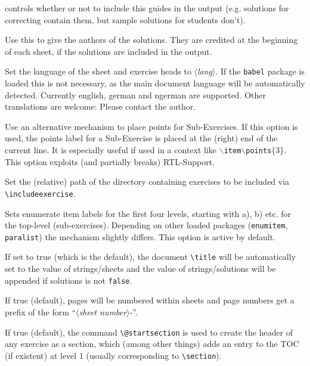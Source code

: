 \documentclass[DIV12,BCOR0mm]{scrartcl}
\newcommand{\param}[1]{$\langle${\normalfont\itshape #1\/}$\rangle$}
\newcommand{\maybe}[1]{\textcolor{green!50!black}{#1}}
\newcommand{\mand}[1]{\textcolor{blue!50!black}{#1}}
\newcommand{\codestyle}{\normalfont\ttfamily\color{blue!50!black}}
\newcommand{\optionstyle}{\normalfont\ttfamily\color{red!50!black}}
\newcommand{\option}[1]{{\optionstyle #1}}
\newcommand{\optitem}[1][]{\item[{\codestyle #1}]}
\begin{document}
\begin{description}
  controls whether or not to include this guides in the output (e.g. solutions for
  correcting contain them, but sample solutions for students don't).
 \optitem[{\option{solutionsby}=\mand{\param{name/names}}}] Use this to give the authors of the
  solutions. They are credited at the beginning of each sheet, if the solutions
  are included in the output.
 \optitem[{\option{language}=\mand{\param{lang}}}] Set the language of the sheet and
  exercise heads to \param{lang}. If the \texttt{babel} package is loaded this
  is not necessary, as the main document language will be automatically
  detected. Currently \option{english}, \option{german} and \option{ngerman} are
  supported. Other translations are welcome: Please contact the author.
 \optitem[{\option{pointsfloatright}}] Use an alternative mechanism to place points for Sub-Exercises.
  If this option is used, the points label for a Sub-Exercise is placed at the (right) end of the current line.
  It is especially useful if used in a context like \texttt{$\backslash$item$\backslash$points$\{3\}$}.
  This option exploits (and partially breaks) RTL-Support.
 \optitem[{\option{exercisespath}}] Set the (relative) path of the
  directory containing exercises to be included via
  \lstinline|\includeexercise|.
 \optitem[{\option{patchenumerate}\maybe{=\param{true/false}}}] Sets
  enumerate item labels for the first four levels, starting with
  a), b) etc. for the top-level (sub-exercises). Depending on other
  loaded packages (\lstinline|enumitem|, \lstinline|paralist|) the mechanism
  slightly differs. This option is active by default.
 \optitem[{\option{settitle}\maybe{=\param{true/false}}}] If set to true
  (which is the default),
  the document \lstinline|\title| will be automatically set to the value
  of \option{strings/sheets} and the value of \option{strings/solutions} will be
  appended if \option{solutions} is not \lstinline|false|.
 \optitem[{\option{patchpagenumbers}\maybe{=\param{true/false}}}] If true
  (default), pages will be numbered within sheets and page numbers
  get a prefix of the form ``{\codestyle\param{sheet number}-}''.
 \optitem[{\option{usestartsection}\maybe{=\param{true/false}}}] If true
  (default), the command \lstinline|\@startsection| is used to create
  the header of any exercise as a section, which (among other
  things) adds an entry to the TOC (if existent) at level 1
  (usually corresponding to \lstinline|\section|).

\end{description}
\end{document}
